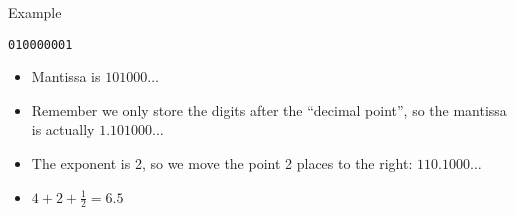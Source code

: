 \begin{frame}{Example}
	\pause
	\begin{center}
		\texttt{010000001}
	\end{center}
	\begin{itemize}
		\pause\item Mantissa is $101000\dots$
		\pause\item Remember we only store the digits after the ``decimal point'', so the mantissa
			is actually $1.101000\dots$
		\pause\item The exponent is 2, so we move the point 2 places to the right:
			$110.1000\dots$
		\pause\item $4 + 2 + \frac12 = 6.5$
	\end{itemize}
\end{frame}

%

